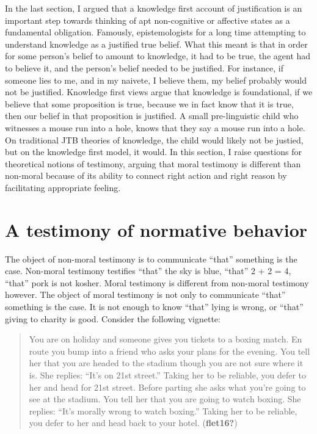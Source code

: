 \documentclass[12pt]{book}
\theoremstyle{definition}
\theoremstyle{remark}
\begin{document}
In the last section, I argued that a knowledge first account of justification is an important step towards thinking of apt non-cognitive or affective states as a fundamental obligation. Famously, epistemologists for a long time attempting to understand knowledge as a justified true belief. What this meant is that in order for some person's belief to amount to knowledge, it had to be true, the agent had to believe it, and the person's belief needed to be justified. For instance, if someone lies to me, and in my naivete, I believe them, my belief probably would not be justified. Knowledge first views argue that knowledge is foundational, if we believe that some proposition is true, because we in fact know that it is true, then our belief in that proposition is justified. A small pre-linguistic child who witnesses a mouse run into a hole, knows that they say a mouse run into a hole. On traditional JTB theories of knowledge, the child would likely not be justied, but on the knowledge first model, it would. In this section, I raise questions for theoretical notions of testimony, arguing that moral testimony is different than non-moral because of its ability to connect right action and right reason by facilitating appropriate feeling.

\section{A testimony of normative behavior}\label{a-testimony-of-normative-behavior}

The object of non-moral testimony is to communicate ``that'' something is the case. Non-moral testimony testifies ``that'' the sky is blue, ``that'' 2 + 2 = 4, ``that'' pork is not kosher. Moral testimony is different from non-moral testimony however. The object of moral testimony is not only to communicate ``that'' something is the case. It is not enough to know ``that'' lying is wrong, or ``that'' giving to charity is good. Consider the following vignette:

\begin{quote}
You are on holiday and someone gives you tickets to a boxing match. En route you bump into a friend who asks your plans for the evening. You tell her that you are headed to the stadium though you are not sure where it is. She replies: ``It's on 21st street.'' Taking her to be reliable, you defer to her and head for 21st street. Before parting she asks what you're going to see at the stadium. You tell her that you are going to watch boxing. She replies: ``It's morally wrong to watch boxing.'' Taking her to be reliable, you defer to her and head back to your hotel. (\textbf{flet16?})
\end{quote}
\end{document}
